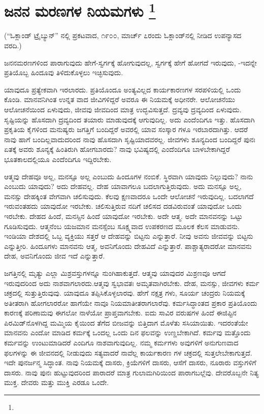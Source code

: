 
\chapter[ಜನನ ಮರಣಗಳ ನಿಯಮಗಳು ]{ಜನನ ಮರಣಗಳ ನಿಯಮಗಳು \protect\footnote{}}

\centerline{(“ಓಕ್ಲಾಂಡ್​ ಟ್ರೈಬ್ಯುನ್​” ನಲ್ಲಿ ಪ್ರಕಟವಾದ, ೧೯೦೦, ಮಾರ್ಚ್​ ೭ರಂದು ಓಕ್ಲಾಂಡ್​ನಲ್ಲಿ ನೀಡಿದ ಉಪನ್ಯಾಸದ ವರದಿ.)}

ಜನನಮರಣಗಳಿಂದ ಪಾರಾಗುವುದು ಹೇಗೆ-ಸ್ವರ್ಗಕ್ಕೆ ಹೋಗುವುದಲ್ಲ, ಸ್ವರ್ಗಕ್ಕೆ ಹೇಗೆ ಹೋಗದೆ ಇರುವುದು, -ಇದನ್ನೇ ಪ್ರತಿಯೊಬ್ಬ ಹಿಂದೂವು ತಿಳಿದುಕೊಳ್ಳಲು ಇಚ್ಛಿಸುವುದು.

ಯಾವುದೂ ಪ್ರತ್ಯೇಕವಾಗಿ ಇರಲಾರದು. ಪ್ರತಿಯೊಂದೂ ಅಂತ್ಯವಿಲ್ಲದ ಕಾರ್ಯಕಾರಣಗಳ ಸರಪಳಿಯಲ್ಲಿ ಒಂದು ಕೊಂಡಿ. ಮಾನವನಿಗಿಂತ ಉನ್ನತ ವಾದ ಜೀವಿಗಳಿದ್ದರೆ ಅವರೂ ಈ ನಿಯಮಕ್ಕೆ ಅಧೀನರೇ. ಆಲೋಚನೆಯು ಆಲೋಚನೆಯಿಂದ ಏಳುವುದು, ಜೀವವು ಜೀವದಿಂದ ಮಾತ್ರ ಉದ್ಭವಿಸುತ್ತದೆ. ದ್ರವ್ಯವು ದ್ರವ್ಯದಿಂದ ಏಳುವುದು. ಸೃಷ್ಟಿಯನ್ನು ಹೊಸದಾಗಿ ದ್ರವ್ಯದಿಂದ ತಯಾರು ಮಾಡುವುದಕ್ಕೆ ಆಗುವುದಿಲ್ಲ. ಅದು ಎಂದೆಂದಿಗೂ ಇತ್ತು. ಹೊಸದಾಗಿ ಪ್ರಕೃತಿಯ ಕೈಗಳಿಂದ ಮನುಷ್ಯರು ಜಗತ್ತಿಗೆ ಬಂದಿದ್ದರೆ ಅವರಲ್ಲಿ ಯಾವ ಸಂಸ್ಕಾರ ಗಳೂ ಇರಬಾರದಾಗಿತ್ತು. ಆದರೆ ನಾವು ಹಾಗೆ ಬಂದಿಲ್ಲವಾದುದರಿಂದ ನಾವು ಹೊಸದಾಗಿ ಸೃಷ್ಟಿಯಾದವರಲ್ಲ. ಜೀವಗಳು ಶೂನ್ಯದಿಂದ ಬಂದಿದ್ದರೆ ಪುನಃ ಏತಕ್ಕೆ ಅವರು ಶೂನ್ಯಕ್ಕೆ ಹಿಂತಿರುಗಿ ಹೋಗಬಾರದು? ನಾವು ಭವಿಷ್ಯದಲ್ಲಿ ಎಂದೆಂದಿಗೂ ಬಾಳಬೇಕಾಗಿದ್ದರೆ ಭೂತಕಾಲದಲ್ಲಿಯೂ ಎಂದೆಂದಿಗೂ ಇದ್ದಿರಬೇಕು.

ಆತ್ಮವು ದೇಹವೂ ಅಲ್ಲ, ಮನಸ್ಸೂ ಅಲ್ಲ ಎಂಬುದು ಹಿಂದೂಗಳ ನಂಬಿಕೆ. ಸ್ಥಿರವಾಗಿ ಯಾವುದು ನಿಲ್ಲುವುದು? ನಾನು ಎಂಬುದು ಯಾವುದು? ಅದು ದೇಹವಲ್ಲ. ದೇಹ ಯಾವಾಗಲೂ ಬದಲಾಗುತ್ತಿರುವುದು. ಅದು ಮನಸ್ಸೂ ಅಲ್ಲ, ಮನಸ್ಸು ದೇಹಕ್ಕಿಂತ ವೇಗವಾಗಿ ಚಲಿಸುವುದು. ಕೆಲವು ಕ್ಷಣವಾದರೂ ಒಂದೇ ಆಲೋಚನೆ ಇರುವುದಿಲ್ಲ. ಬದಲಾಗದೆ ಇರುವಂತಹದು ಯಾವುದೋ ಇರಬೇಕು. ಚಲಿಸುತ್ತಿರುವ ನದಿಗೆ ಚಲಿಸದ ದಡವಿರುವಂತೆ ಯಾವುದೋ ಒಂದು ಇರಬೇಕು. ದೇಹದ ಹಿಂದೆ, ಮನಸ್ಸಿನ ಹಿಂದೆ ಯಾವುದೋ ಇರಬೇಕು. ಅದೇ ಆತ್ಮ. ಅದೇ ಮಾನವನನ್ನು ಒಟ್ಟು ಗೂಡಿಸುವುದು. ಆತ್ಮನೆಂಬ ಯಜಮಾನ ಮನಸ್ಸೆಂಬ ಸೂಕ್ಷ್ಮವಾದ ಉಪಕರಣದ ಮೂಲಕ ಕೆಲಸ ಮಾಡುವನು. ಇಂಡಿಯಾ ದೇಶದಲ್ಲಿ ಒಬ್ಬ ವ್ಯಕ್ತಿಯು ಸತ್ತರೆ ಆ ದೇಹವನ್ನು ಬಿಟ್ಟನು ಎನ್ನುತ್ತಾರೆ. ನೀವು ಅವನು ಜೀವವನ್ನು ಬಿಟ್ಟನು ಎನ್ನುತ್ತೀರಿ. ಹಿಂದೂಗಳು ಮಾನವನು ಆತ್ಮ, ಅವನಿಗೊಂದು ದೇಹವಿದೆ ಎನ್ನುತ್ತಾರೆ. ಪಾಶ್ಚಾತ್ಯರಾದರೋ ಮಾನವನು ದೇಹ, ಅವನಿಗೊಂದು ಜೀವ ಇದೆ ಎನ್ನುತ್ತಾರೆ.

ಜಗತ್ತಿನಲ್ಲಿ ಮೃತ್ಯು ಎಲ್ಲಾ ಮಿಶ್ರವಸ್ತುಗಳನ್ನೂ ನುಂಗಿಹಾಕುತ್ತದೆ. ಆತ್ಮವು ಯಾವುದರ ಮಿಶ್ರಣವೂ ಆಗದೆ ಇರುವುದರಿಂದ ಅದು ನಾಶವಾಗಲಾರದು.ಆತ್ಮವು ಸ್ವಭಾವತಃ ಅಮೃತವಾಗಿರಬೇಕು. ದೇಹ, ಮನಸ್ಸು, ಜೀವಗಳು ಕರ್ಮ ಚಕ್ರದಲ್ಲಿ ಸುತ್ತುತ್ತಿರುವುವು. ಯಾವುದೂ ತಪ್ಪಿಸಿಕೊಳ್ಳಲಾರವು. ಹೇಗೆ ನಕ್ಷತ್ರ ಗಳು, ಸೂರ್ಯ ಚಂದ್ರರು ನಿಯಮಕ್ಕೆ ಅತೀತರಾಗಿ ಹೋಗಲಾರರೋ ಹಾಗೆಯೇ ನಾವೂ ನಿಯಮಾತೀತರಾಗಲಾರೆವು. ಕರ್ಮಸಿದ್ಧಾಂತದ ಪ್ರಕಾರ ಪ್ರತಿಯೊಂದು ಕಾರಣಕ್ಕೆ ಪರಿಣಾಮವು ಈಗಲೋ ನಾಳೆಯೋ ಪ್ರಾಪ್ತವಾಗಬೇಕು. ಐದು ಸಾವಿರ ವರುಷಗಳ ಹಿಂದೆ ಈಜಿಪ್ಟಿನ ಪಿರಮಿಡ್​ನೊಳಗಿದ್ದ ಮಮ್ಮಿಯ ಕೈಯಿಂದ ತೆಗೆದ ಬೀಜವನ್ನು ಬಿತ್ತಿದಾಗ ಮೊಳೆತು ಸಸಿಯಾಯಿತು. ಇದರಂತೆಯೇ ಮಾನವನು ಎಂದೋ ಮಾಡಿದ ಕರ್ಮಕ್ಕೆ ಒಂದಲ್ಲ ಒಂದು ದಿನ ಫಲವನ್ನು ಉಣ್ಣಬೇಕಾಗಿದೆ. ಕರ್ಮವು ಮತ್ತೊಂದು ಕರ್ಮವನ್ನು ಉಂಟುಮಾಡಿದರೆ ಎಂದಿಗೂ ನಾಶವಾಗುವುದಿಲ್ಲ. ನಮ್ಮ ಕರ್ಮಗಳು ಅವುಗಳಿಗೆ ಅನುಗುಣವಾದ ಫಲಗಳನ್ನು ಈ ಜೀವನದಲ್ಲಿ ನೀಡುವುದು ಸತ್ಯವಾದರೆ ನಾವೆಲ್ಲ ಕಾರ್ಯಕಾರಣ ಗಳ ಚಕ್ರದಲ್ಲಿ ಸುತ್ತಲೇಬೇಕಾಗುತ್ತದೆ. ಇದೇ ಪುನರ್ಜನ್ಮ ಸಿದ್ಧಾಂತ. ನಾವು ನಿಯಮಕ್ಕೆ ದಾಸರು, ಕ್ರಿಯೆಗಳಿಗೆ ದಾಸರು, ಆಸೆಗೆ ದಾಸರು, ನೂರಾರು ವಸ್ತುಗಳಿಗೆ ದಾಸರು. ನಾವು ಪುನಃ ಹುಟ್ಟುವುದರಿಂದ ಪಾರಾದರೆ ಮಾತ್ರ ಗುಲಾಮಗಿರಿಯಿಂದ ಪಾರಾಗಬಲ್ಲೆವು. ದೇವರೊಬ್ಬನೇ ನಿತ್ಯ ಮುಕ್ತ. ದೇವರು ಮತ್ತು ಮುಕ್ತಿ ಎರಡೂ ಒಂದೇ.

